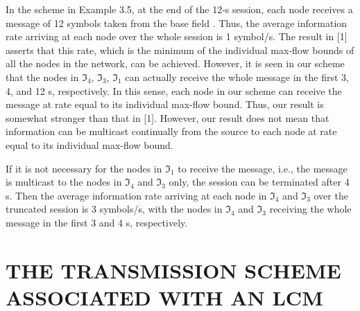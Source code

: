 \documentclass{IEEEtran}
\begin{document}
\par	
In the scheme in Example 3.5, at the end of the 12-s session, each node receives a message of 12 symbols taken from the base field . Thus, the average information rate arriving at each node over the whole session is 1 symbol/s. The result in [1] asserts that this rate, which is the minimum of the individual max-flow bounds of all the nodes in the network, can be achieved. However, it is seen in our scheme that the nodes in $\Im_4$, $\Im_3$, $\Im_1$ can actually receive the whole message in the first 3, 4, and 12 s, respectively. In this sense, each node in our scheme can receive the message at rate equal to its individual max-flow bound. Thus, our result is somewhat stronger than that in [1]. However, our result does not mean that information can be multicast continually from the source to each node at rate equal to its individual max-flow bound.
\par
If it is not necessary for the nodes in $\Im_1$ to receive the message, i.e., the message is multicast to the nodes in $\Im_4$ and $\Im_3$ only, the session can be terminated after 4 s. Then the average information rate arriving at each node in $\Im_4$ and $\Im_3$ over the truncated session is 3 symbols/s, with the nodes in $\Im_4$ and $\Im_3$ receiving the whole message in the first 3 and 4 s, respectively.

\section{THE TRANSMISSION SCHEME ASSOCIATED WITH AN LCM}\label{sec:scheme}
\end{document}
